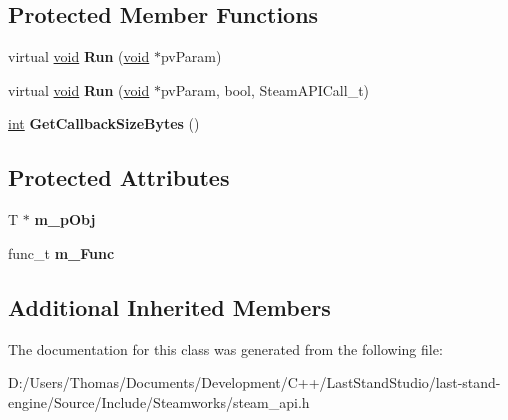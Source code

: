 \subsection*{Protected Member Functions}
\begin{DoxyCompactItemize}
\item 
\hypertarget{classCCallback_ae5639a818ea89912b598515afb27486b}{}virtual \hyperlink{SDL__audio_8h_a52835ae37c4bb905b903cbaf5d04b05f}{void} {\bfseries Run} (\hyperlink{SDL__audio_8h_a52835ae37c4bb905b903cbaf5d04b05f}{void} $\ast$pv\+Param)\label{classCCallback_ae5639a818ea89912b598515afb27486b}

\item 
\hypertarget{classCCallback_af8e53a26ddf537c8f846aae39d3a9fac}{}virtual \hyperlink{SDL__audio_8h_a52835ae37c4bb905b903cbaf5d04b05f}{void} {\bfseries Run} (\hyperlink{SDL__audio_8h_a52835ae37c4bb905b903cbaf5d04b05f}{void} $\ast$pv\+Param, bool, Steam\+A\+P\+I\+Call\+\_\+t)\label{classCCallback_af8e53a26ddf537c8f846aae39d3a9fac}

\item 
\hypertarget{classCCallback_a9e51fe1650566dbf421f7ca6638b40cc}{}\hyperlink{SDL__thread_8h_a6a64f9be4433e4de6e2f2f548cf3c08e}{int} {\bfseries Get\+Callback\+Size\+Bytes} ()\label{classCCallback_a9e51fe1650566dbf421f7ca6638b40cc}

\end{DoxyCompactItemize}
\subsection*{Protected Attributes}
\begin{DoxyCompactItemize}
\item 
\hypertarget{classCCallback_a28308b4bd15950fe4ad3250f8f874b72}{}T $\ast$ {\bfseries m\+\_\+p\+Obj}\label{classCCallback_a28308b4bd15950fe4ad3250f8f874b72}

\item 
\hypertarget{classCCallback_ae124e963c7d61fd084912947db3d0b35}{}func\+\_\+t {\bfseries m\+\_\+\+Func}\label{classCCallback_ae124e963c7d61fd084912947db3d0b35}

\end{DoxyCompactItemize}
\subsection*{Additional Inherited Members}


The documentation for this class was generated from the following file\+:\begin{DoxyCompactItemize}
\item 
D\+:/\+Users/\+Thomas/\+Documents/\+Development/\+C++/\+Last\+Stand\+Studio/last-\/stand-\/engine/\+Source/\+Include/\+Steamworks/steam\+\_\+api.\+h\end{DoxyCompactItemize}
